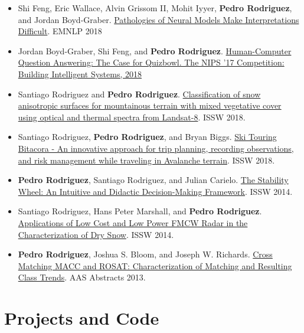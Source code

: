 \documentclass[11pt,a4paper,sans]{moderncv} %
\begin{document}
{\begin{itemize}
    \item Shi Feng, Eric Wallace, Alvin Grissom II, Mohit Iyyer, \textbf{Pedro Rodriguez}, and Jordan Boyd-Graber. \href{https://arxiv.org/abs/1804.07781}{Pathologies of Neural Models Make Interpretations Difficult}. EMNLP 2018
    \item Jordan Boyd-Graber, Shi Feng, and \textbf{Pedro Rodriguez}. \href{https://www.entilzha.io/static/publications/2018_nips_qbcomp.pdf}{Human-Computer Question Answering: The Case for Quizbowl. The NIPS '17 Competition: Building Intelligent Systems, 2018}
	\item Santiago Rodriguez and \textbf{Pedro Rodriguez}. \href{https://arc.lib.montana.edu/snow-science/objects/ISSW2018_P04.4.pdf}{Classification of snow anisotropic surfaces for mountainous terrain with mixed vegetative cover using optical and thermal spectra from Landsat-8}. ISSW 2018.
	\item Santiago Rodriguez, \textbf{Pedro Rodriguez}, and Bryan Biggs. \href{https://arc.lib.montana.edu/snow-science/objects/ISSW2018_P18.4.pdf}{Ski Touring Bitacora - An innovative approach for trip planning, recording observations, and risk management while traveling in Avalanche terrain}. ISSW 2018.
	\item \textbf{Pedro Rodriguez}, Santiago Rodriguez, and Julian Carielo. \href{http://arc.lib.montana.edu/snow-science/objects/ISSW14_paper_P4.34.pdf}{The Stability Wheel: An Intuitive and Didactic Decision-Making Framework}. ISSW 2014.
	\item Santiago Rodriguez, Hans Peter Marshall, and \textbf{Pedro Rodriguez}. \href{http://citeseerx.ist.psu.edu/viewdoc/download?doi=10.1.1.977.7907&rep=rep1&type=pdf}{Applications of Low Cost and Low Power FMCW Radar in the Characterization of Dry Snow}. ISSW 2014.
	\item \textbf{Pedro Rodriguez}, Joshua S. Bloom, and Joseph W. Richards. \href{http://adsabs.harvard.edu/abs/2013AAS...22135428R}{Cross Matching MACC and ROSAT: Characterization of Matching and Resulting Class Trends}. AAS Abstracts 2013.
  \end{itemize}
}{}

\section{Projects and Code}

\vspace{-2ex}
\end{document}
